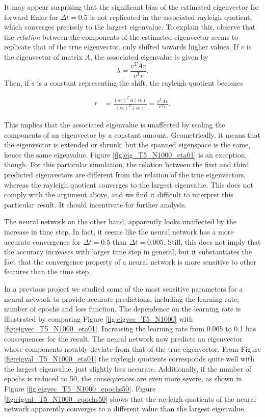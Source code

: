 \documentclass[12pt]{extarticle}
\begin{document}
It may appear surprising that the significant bias of the estimated eigenvector for forward Euler for $\Delta t =0.5$ is not replicated in the associated rayleigh quotient, which converges precisely to the largest eigenvalue. To explain this, observe that the \textit{relation} between the components of the estimated eigenvector seems to replicate that of the true eigenvector, only shifted towards higher values. If $v$ is the eigenvector of matrix $A$, the associated eigenvalue is given by
\[ \lambda = \frac{v^T A v}{v^T v}. \]
Then, if $s$ is a constant representing the shift, the rayleigh quotient becomes

\begin{align*}
	r &= \frac{(sv)^T A (sv)}{(sv)^T (sv)} = \frac{v^T A v}{v^T v}.
\end{align*}

This implies that the associated eigenvalue is unaffected by scaling the components of an eigenvector by a constant amount. Geometrically, it means that the eigenvector is extended or shrunk, but the spanned eigenspace is the same, hence the same eigenvalue. Figure \ref{fig:eig_T5_N1000_eta01} is an exception, though. For this particular simulation, the relation between the first and third predicted eigenvectors are different from the relation of the true eigenvectors, whereas the rayleigh quotient converges to the largest eigenvalue. This does not comply with the argument above, and we find it difficult to interpret this particular result. It should incentivate for further analysis.

The neural network on the other hand, apparently looks unaffected by the increase in time step. In fact, it seems like the neural network has a more accurate convergence for $\Delta t = 0.5$ than $\Delta t = 0.005$. Still, this does not imply that the accuracy increases with larger time step in general, but it substantiates the fact that the convergence property of a neural network is more sensitive to other features than the time step. 

In a previous project \cite{project2} we studied some of the most sensitive parameters for a neural network to provide accurate predictions, including the learning rate, number of epochs and loss function. The dependence on the learning rate is illustrated by comparing Figure \ref{fig:eigvec_T5_N1000} with \ref{fig:eigvec_T5_N1000_eta01}. Increasing the learning rate from 0.005 to 0.1 has consequences for the result. The neural network now predicts an eigenvector whose components notably deviate from that of the true eigenvector. From Figure \ref{fig:eigval_T5_N1000_eta01} the rayleigh quotients corresponds quite well with the largest eigenvalue, just slightly less accurate. Additionally, if the number of epochs is reduced to 50, the consequences are even more severe, as shown in Figure \ref{fig:eigvec_T5_N1000_epochs50}. Figure \ref{fig:eigval_T5_N1000_epochs50} shows that the rayleigh quotients of the neural network apparently converges to a different value than the largest eigenvalue. 
\end{document}
